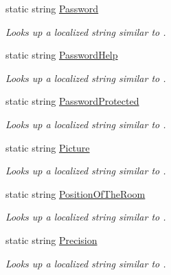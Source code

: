 \begin{DoxyCompactItemize}
static string \hyperlink{class_wis_r_1_1_app___resources_1_1_resource_a5bc96c05e84603e9c1f5e337a22c2156}{Password}
\begin{DoxyCompactList}\small\item\em Looks up a localized string similar to . \end{DoxyCompactList}\item 
static string \hyperlink{class_wis_r_1_1_app___resources_1_1_resource_a8baf6c99971b155c1034c799596ab233}{Password\+Help}
\begin{DoxyCompactList}\small\item\em Looks up a localized string similar to . \end{DoxyCompactList}\item 
static string \hyperlink{class_wis_r_1_1_app___resources_1_1_resource_aa1491c80789d2e46e8ac42c1bca6b46f}{Password\+Protected}
\begin{DoxyCompactList}\small\item\em Looks up a localized string similar to . \end{DoxyCompactList}\item 
static string \hyperlink{class_wis_r_1_1_app___resources_1_1_resource_a5844dd582db1d6a0c9eebcb37383a0c7}{Picture}
\begin{DoxyCompactList}\small\item\em Looks up a localized string similar to . \end{DoxyCompactList}\item 
static string \hyperlink{class_wis_r_1_1_app___resources_1_1_resource_a8661f34dc9d6206c5c73821f5a050bb0}{Position\+Of\+The\+Room}
\begin{DoxyCompactList}\small\item\em Looks up a localized string similar to . \end{DoxyCompactList}\item 
static string \hyperlink{class_wis_r_1_1_app___resources_1_1_resource_aeb21a92eea97485f5d1a35971d47de86}{Precision}
\begin{DoxyCompactList}\small\item\em Looks up a localized string similar to . \end{DoxyCompactList}\item 

\end{DoxyCompactItemize}
